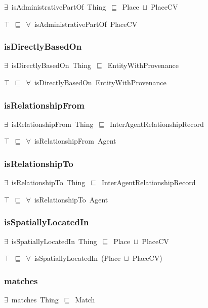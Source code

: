 \documentclass{article}
\begin{document}
\ensuremath{\exists}~isAdministrativePartOf~Thing~\ensuremath{\sqsubseteq}~Place~\ensuremath{\sqcup}~PlaceCV

\ensuremath{\top}~\ensuremath{\sqsubseteq}~\ensuremath{\forall}~isAdministrativePartOf~PlaceCV

\subsubsection*{isDirectlyBasedOn}

\ensuremath{\exists}~isDirectlyBasedOn~Thing~\ensuremath{\sqsubseteq}~EntityWithProvenance

\ensuremath{\top}~\ensuremath{\sqsubseteq}~\ensuremath{\forall}~isDirectlyBasedOn~EntityWithProvenance

\subsubsection*{isRelationshipFrom}

\ensuremath{\exists}~isRelationshipFrom~Thing~\ensuremath{\sqsubseteq}~InterAgentRelationshipRecord

\ensuremath{\top}~\ensuremath{\sqsubseteq}~\ensuremath{\forall}~isRelationshipFrom~Agent

\subsubsection*{isRelationshipTo}

\ensuremath{\exists}~isRelationshipTo~Thing~\ensuremath{\sqsubseteq}~InterAgentRelationshipRecord

\ensuremath{\top}~\ensuremath{\sqsubseteq}~\ensuremath{\forall}~isRelationshipTo~Agent

\subsubsection*{isSpatiallyLocatedIn}

\ensuremath{\exists}~isSpatiallyLocatedIn~Thing~\ensuremath{\sqsubseteq}~Place~\ensuremath{\sqcup}~PlaceCV

\ensuremath{\top}~\ensuremath{\sqsubseteq}~\ensuremath{\forall}~isSpatiallyLocatedIn~(Place~\ensuremath{\sqcup}~PlaceCV)

\subsubsection*{matches}

\ensuremath{\exists}~matches~Thing~\ensuremath{\sqsubseteq}~Match
\end{document}
